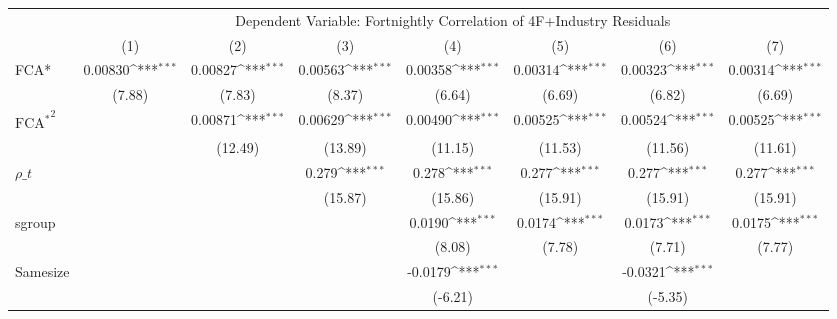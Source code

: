 {
\def\sym#1{\ifmmode^{#1}\else\(^{#1}\)\fi}
\begin{tabular}{l*{7}{c}}
\hline\hline
 & \multicolumn{7}{c}{Dependent Variable: Fortnightly Correlation of 4F+Industry Residuals}                 \\
 \cline{2-8}
                    &\multicolumn{1}{c}{(1)}         &\multicolumn{1}{c}{(2)}         &\multicolumn{1}{c}{(3)}         &\multicolumn{1}{c}{(4)}         &\multicolumn{1}{c}{(5)}         &\multicolumn{1}{c}{(6)}         &\multicolumn{1}{c}{(7)}         \\
\hline
FCA*          &     0.00830\sym{***}&     0.00827\sym{***}&     0.00563\sym{***}&     0.00358\sym{***}&     0.00314\sym{***}&     0.00323\sym{***}&     0.00314\sym{***}\\
                    &      (7.88)         &      (7.83)         &      (8.37)         &      (6.64)         &      (6.69)         &      (6.82)         &      (6.69)         \\
[1em]
${\text{FCA}^*}^2 $    &                     &     0.00871\sym{***}&     0.00629\sym{***}&     0.00490\sym{***}&     0.00525\sym{***}&     0.00524\sym{***}&     0.00525\sym{***}\\
                    &                     &     (12.49)         &     (13.89)         &     (11.15)         &     (11.53)         &     (11.56)         &     (11.61)         \\
[1em]
$ \rho\_t $          &                     &                     &       0.279\sym{***}&       0.278\sym{***}&       0.277\sym{***}&       0.277\sym{***}&       0.277\sym{***}\\
                    &                     &                     &     (15.87)         &     (15.86)         &     (15.91)         &     (15.91)         &     (15.91)         \\
[1em]
sgroup              &                     &                     &                     &      0.0190\sym{***}&      0.0174\sym{***}&      0.0173\sym{***}&      0.0175\sym{***}\\
                    &                     &                     &                     &      (8.08)         &      (7.78)         &      (7.71)         &      (7.77)         \\
[1em]
Samesize            &                     &                     &                     &     -0.0179\sym{***}&                     &     -0.0321\sym{***}&                     \\
                    &                     &                     &                     &     (-6.21)         &                     &     (-5.35)         &                     \\

\end{tabular}}
